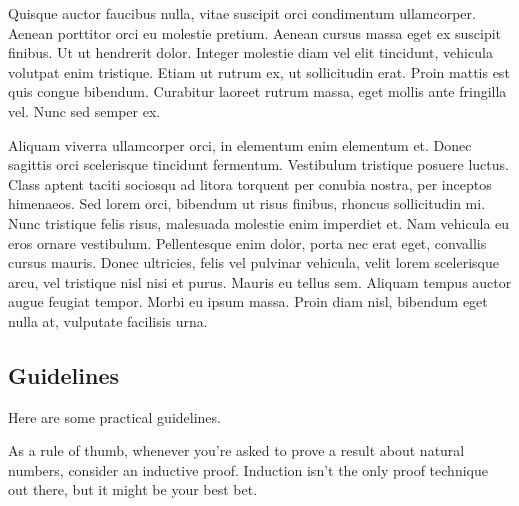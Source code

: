 \documentclass{scrreprt}
\begin{document}
Quisque auctor faucibus nulla, vitae suscipit orci condimentum ullamcorper. Aenean porttitor orci eu molestie pretium. Aenean cursus massa eget ex suscipit finibus. Ut ut hendrerit dolor. Integer molestie diam vel elit tincidunt, vehicula volutpat enim tristique. Etiam ut rutrum ex, ut sollicitudin erat. Proin mattis est quis congue bibendum. Curabitur laoreet rutrum massa, eget mollis ante fringilla vel. Nunc sed semper ex.

Aliquam viverra ullamcorper orci, in elementum enim elementum et. Donec sagittis orci scelerisque tincidunt fermentum. Vestibulum tristique posuere luctus. Class aptent taciti sociosqu ad litora torquent per conubia nostra, per inceptos himenaeos. Sed lorem orci, bibendum ut risus finibus, rhoncus sollicitudin mi. Nunc tristique felis risus, malesuada molestie enim imperdiet et. Nam vehicula eu eros ornare vestibulum. Pellentesque enim dolor, porta nec erat eget, convallis cursus mauris. Donec ultricies, felis vel pulvinar vehicula, velit lorem scelerisque arcu, vel tristique nisl nisi et purus. Mauris eu tellus sem. Aliquam tempus auctor augue feugiat tempor. Morbi eu ipsum massa. Proin diam nisl, bibendum eget nulla at, vulputate facilisis urna.

\subsection*{Guidelines}
Here are some practical guidelines.

As a rule of thumb, whenever you're asked to prove a result about natural numbers, consider an inductive proof. Induction isn't the only proof technique out there, but it might be your best bet.
\end{document}
